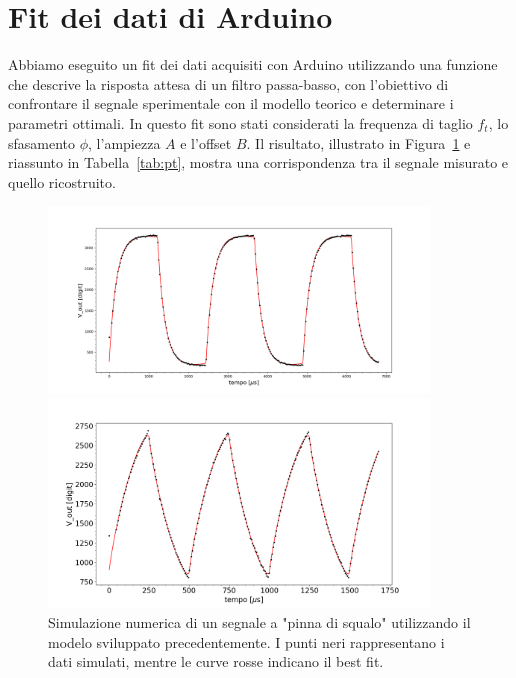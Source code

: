 \documentclass[10pt,a4paper]{article}
\begin{document}
\section{Fit dei dati di Arduino}

Abbiamo eseguito un fit dei dati acquisiti con Arduino utilizzando una funzione che descrive la risposta attesa di un filtro passa-basso, con l’obiettivo di confrontare il segnale sperimentale con il modello teorico e determinare i parametri ottimali. In questo fit sono stati considerati la frequenza di taglio \(f_t\), lo sfasamento \(\phi\), l'ampiezza \(A\) e l'offset \(B\). Il risultato, illustrato in Figura~\ref{fig:Fit} e riassunto in Tabella~\ref{tab:pt}, mostra una corrispondenza tra il segnale misurato e quello ricostruito.


\begin{figure}[H]
    \centering
    \vspace{-1cm}
    \includegraphics[width=0.9\textwidth]{img/fit_aj.png}
    
    \includegraphics[width=0.9\textwidth]{img/fit_cj.png}
	\caption{Simulazione numerica di un segnale a "pinna di squalo" utilizzando il modelo sviluppato precedentemente. I punti neri rappresentano i dati simulati, mentre le curve rosse indicano il best fit.}  
\label{fig:Fit}
\end{figure}
    
\end{document}
